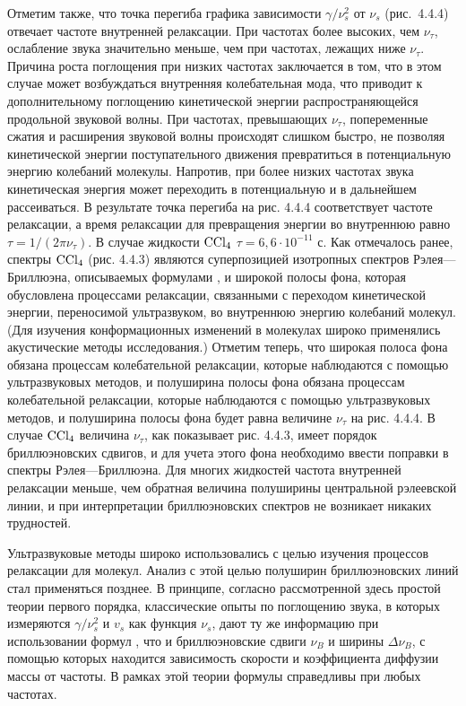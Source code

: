 Отметим также, что точка перегиба графика зависимости
$\gamma/\nu_s^2$ от $\nu_s$ (рис.~4.4.4) отвечает частоте
внутренней релаксации. При частотах более высоких, чем
$\nu_{\tau}$, ослабление звука значительно меньше, чем при
частотах, лежащих ниже $\nu_{\tau}$. Причина роста поглощения при
низких частотах заключается в том, что в этом случае может
возбуждаться внутренняя колебательная мода, что приводит к
дополнительному поглощению кинетической энергии
распространяющейся продольной звуковой волны. При частотах,
превышающих $\nu_{\tau}$, попеременные сжатия и расширения
звуковой волны происходят слишком быстро, не позволяя
кинетической энергии поступательного движения превратиться в
потенциальную энергию колебаний молекулы. Напротив, при более
низких частотах звука кинетическая энергия может переходить в
потенциальную и в дальнейшем рассеиваться. В результате точка
перегиба на рис. 4.4.4 соответствует частоте релаксации, а время
релаксации для превращения энергии во внутреннюю равно
$\tau=1/(2\pi\nu_{\tau})$. В случае жидкости $\rm CCl_4$
$\tau=6,6\cdot10^{-11}$ с. Как отмечалось ранее, спектры $\rm
CCl_4$ (рис. 4.4.3) являются суперпозицией изотропных спектров
Рэлея---Бриллюэна, описываемых формулами , и широкой
полосы фона, которая обусловлена процессами релаксации,
связанными с переходом кинетической энергии, переносимой
ультразвуком, во внутреннюю энергию колебаний молекул. (Для
изучения конформационных изменений в молекулах широко применялись
акустические методы исследования.) Отметим теперь, что
широкая полоса фона обязана процессам колебательной релаксации,
которые наблюдаются с помощью ультразвуковых методов, и
полуширина полосы фона обязана процессам колебательной
релаксации, которые наблюдаются с помощью ультразвуковых методов,
и полуширина полосы фона будет равна величине $\nu_{\tau}$ на
рис. 4.4.4. В случае $\rm CCl_4$ величина $\nu_{\tau}$, как
показывает рис. 4.4.3, имеет порядок бриллюэновских сдвигов, и
для учета этого фона необходимо ввести поправки в спектры Рэлея---Бриллюэна. Для многих жидкостей частота внутренней релаксации
меньше, чем обратная величина полуширины центральной рэлеевской
линии, и при интерпретации бриллюэновских спектров не возникает
никаких трудностей.

Ультразвуковые методы широко использовались с целью изучения
процессов релаксации для молекул. Анализ с этой целью
полуширин бриллюэновских линий стал применяться позднее. В
принципе, согласно рассмотренной здесь простой теории первого
порядка, классические опыты по поглощению звука, в которых
измеряются $\gamma/\nu_s^2$ и $v_s$ как функция $\nu_s$, дают ту
же информацию при использовании формул , что и
бриллюэновские сдвиги $\nu_B$ и ширины $\Delta\nu_B$,  с помощью
которых находится зависимость скорости и коэффициента диффузии
массы от частоты. В рамках этой теории формулы 
справедливы при любых частотах.

